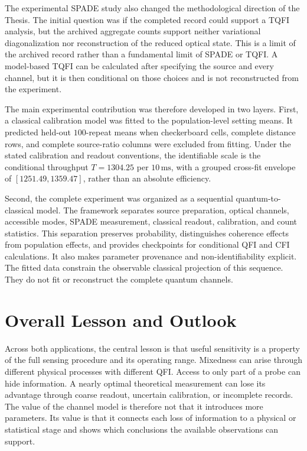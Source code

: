 The experimental SPADE study also changed the methodological direction of the Thesis.  The initial question was if the completed record could support a TQFI analysis, but the archived aggregate counts support neither variational diagonalization nor reconstruction of the reduced optical state.  This is a limit of the archived record rather than a fundamental limit of SPADE or TQFI.  A model-based TQFI can be calculated after specifying the source and every channel, but it is then conditional on those choices and is not reconstructed from the experiment.

The main experimental contribution was therefore developed in two layers.  First, a classical calibration model was fitted to the population-level setting means.  It predicted held-out $100$-repeat means when checkerboard cells, complete distance rows, and complete source-ratio columns were excluded from fitting.  Under the stated calibration and readout conventions, the identifiable scale is the conditional throughput $T=1304.25$ per $10\,\mathrm{ms}$, with a grouped cross-fit envelope of $[1251.49,1359.47]$, rather than an absolute efficiency.

Second, the complete experiment was organized as a sequential quantum-to-classical model.  The framework separates source preparation, optical channels, accessible modes, SPADE measurement, classical readout, calibration, and count statistics.  This separation preserves probability, distinguishes coherence effects from population effects, and provides checkpoints for conditional QFI and CFI calculations.  It also makes parameter provenance and non-identifiability explicit.  The fitted data constrain the observable classical projection of this sequence.  They do not fit or reconstruct the complete quantum channels.

\section{Overall Lesson and Outlook}

Across both applications, the central lesson is that useful sensitivity is a property of the full sensing procedure and its operating range.  Mixedness can arise through different physical processes with different QFI.  Access to only part of a probe can hide information.  A nearly optimal theoretical measurement can lose its advantage through coarse readout, uncertain calibration, or incomplete records.  The value of the channel model is therefore not that it introduces more parameters.  Its value is that it connects each loss of information to a physical or statistical stage and shows which conclusions the available observations can support.

